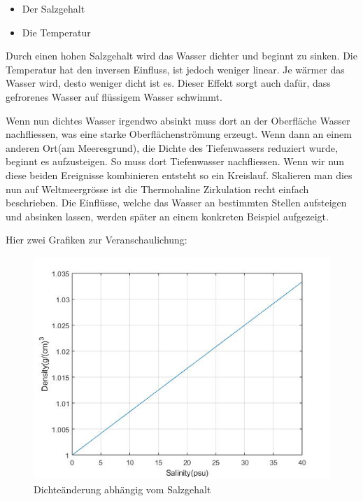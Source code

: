 \begin{itemize}
	\item Der Salzgehalt
	\item Die Temperatur
\end{itemize}

Durch einen hohen Salzgehalt wird das Wasser dichter und beginnt zu sinken. Die Temperatur hat den inversen Einfluss, ist jedoch weniger linear. Je wärmer das Wasser wird, desto weniger dicht ist es. Dieser Effekt sorgt auch dafür, dass gefrorenes Wasser auf flüssigem Wasser schwimmt.

Wenn nun dichtes Wasser irgendwo absinkt muss dort an der Oberfläche Wasser nachfliessen, was eine starke Oberflächenströmung erzeugt. Wenn dann an einem anderen Ort(am Meeresgrund), die Dichte des Tiefenwassers reduziert wurde, beginnt es aufzusteigen. So muss dort Tiefenwasser nachfliessen. Wenn wir nun diese beiden Ereignisse kombinieren entsteht so ein Kreislauf. Skalieren man dies nun auf Weltmeergrösse ist die Thermohaline Zirkulation recht einfach beschrieben. Die Einflüsse, welche das Wasser an bestimmten Stellen aufsteigen und absinken lassen, werden später an einem konkreten Beispiel aufgezeigt.

Hier zwei Grafiken zur Veranschaulichung:

\begin{figure}[H]
	\centering
\includegraphics[width=12cm]{thermohalin/code/graphs/graph_salinity.jpg}
\caption{Dichteänderung abhängig vom Salzgehalt}
\end{figure}

